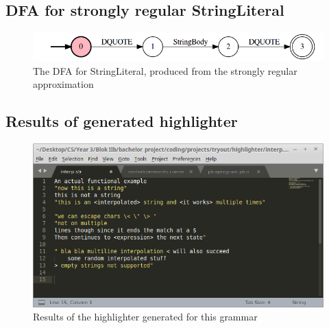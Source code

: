 \subsection{DFA for strongly regular StringLiteral}
\begin{figure}[h]
	\centering
	\includegraphics[width=\textwidth, keepaspectratio]{Figures/String_dfa_stringliteral.png}
	\decoRule
 	\caption[DFA for StringLiteral]{The DFA for StringLiteral, produced from the strongly regular approximation}
 	\label{fig:stringInterp:DFA:StringLiteral}
\end{figure}

\pagebreak\subsection{Results of generated highlighter}
\begin{figure}[h!]
	\centering
	\includegraphics[width=\textwidth, keepaspectratio]{Figures/highlightShots/string_generated.png}
	\decoRule
 	\caption[Generated highlighter results for StringInterpolation grammar]{Results of the highlighter generated for this grammar}
 	\label{fig:stringInterp:highlighter:generated}
\end{figure}

